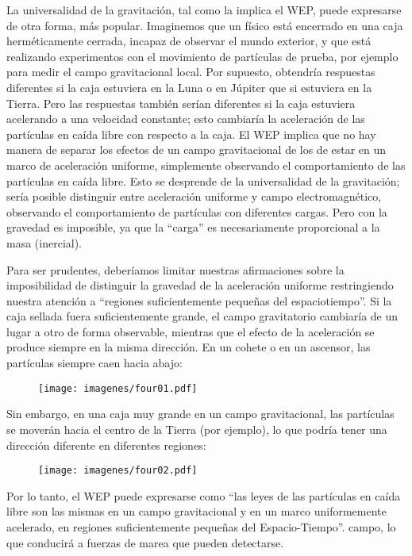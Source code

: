 \documentclass[11pt,b5paper,openany,twoside]{book}
\begin{document}
La universalidad de la gravitación, tal como la implica el WEP, puede expresarse de otra forma, más popular.
Imaginemos que un físico está encerrado en una caja herméticamente cerrada, incapaz de observar el mundo exterior, y que está realizando experimentos con el movimiento de partículas de prueba, por ejemplo para medir el campo gravitacional local.
Por supuesto, obtendría respuestas diferentes si la caja estuviera en la Luna o en Júpiter que si estuviera en la Tierra.
Pero las respuestas también serían diferentes si la caja estuviera acelerando a una velocidad constante; esto cambiaría la aceleración de las partículas en caída libre con respecto a la caja.
El WEP implica que no hay manera de separar los efectos de un campo gravitacional de los de estar en un marco de aceleración uniforme, simplemente observando el comportamiento de las partículas en caída libre.
Esto se desprende de la universalidad de la gravitación; sería posible distinguir entre aceleración uniforme y campo electromagnético, observando el comportamiento de partículas con diferentes cargas.
Pero con la gravedad es imposible, ya que la ``carga'' es necesariamente proporcional a la masa (inercial).

Para ser prudentes, deberíamos limitar nuestras afirmaciones sobre la imposibilidad de distinguir la gravedad de la aceleración uniforme restringiendo nuestra atención a ``regiones suficientemente pequeñas del espaciotiempo''. Si la caja sellada fuera suficientemente grande, el campo gravitatorio cambiaría de un lugar a otro de forma observable, mientras que el efecto de la aceleración se produce siempre en la misma dirección.
En un cohete o en un ascensor, las partículas siempre caen hacia abajo:

\begin{figure}[h]
\centering
\texttt{[image: imagenes/four01.pdf]}
\end{figure}

\noindent
Sin embargo, en una caja muy grande en un campo gravitacional, las partículas se moverán hacia el centro de la Tierra (por ejemplo), lo que podría tener una dirección diferente en diferentes regiones:

\begin{figure}[h]
\centering
\texttt{[image: imagenes/four02.pdf]}
\end{figure}

\noindent
Por lo tanto, el WEP puede expresarse como ``las leyes de las partículas en caída libre son las mismas en un campo gravitacional y en un marco uniformemente acelerado, en regiones suficientemente pequeñas del Espacio-Tiempo''. campo, lo que conducirá a fuerzas de marea que pueden detectarse.
\end{document}

